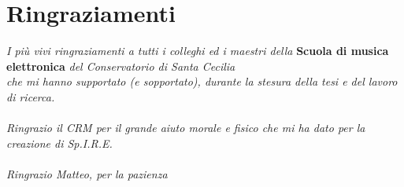 
\chapter*{Ringraziamenti}


\textit{I più vivi ringraziamenti a tutti i colleghi ed i maestri della} \textbf{Scuola di musica elettronica} \textit{del Conservatorio di Santa Cecilia \\ che mi hanno supportato (e sopportato), durante la stesura della tesi e del lavoro di ricerca.}
\\
\\
\textit{Ringrazio il CRM per il grande aiuto morale e fisico che mi ha dato per la creazione di Sp.I.R.E.}
\\
\\
\textit{Ringrazio Matteo, per la pazienza}